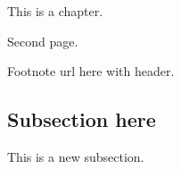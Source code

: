 
This is a chapter.

\newpage

Second page.

Footnote url here with header.

\KittelEquationExpandedX

\subsection{Subsection here}
\label{sec:subsection-here}

This is a new subsection.

\clearpage
